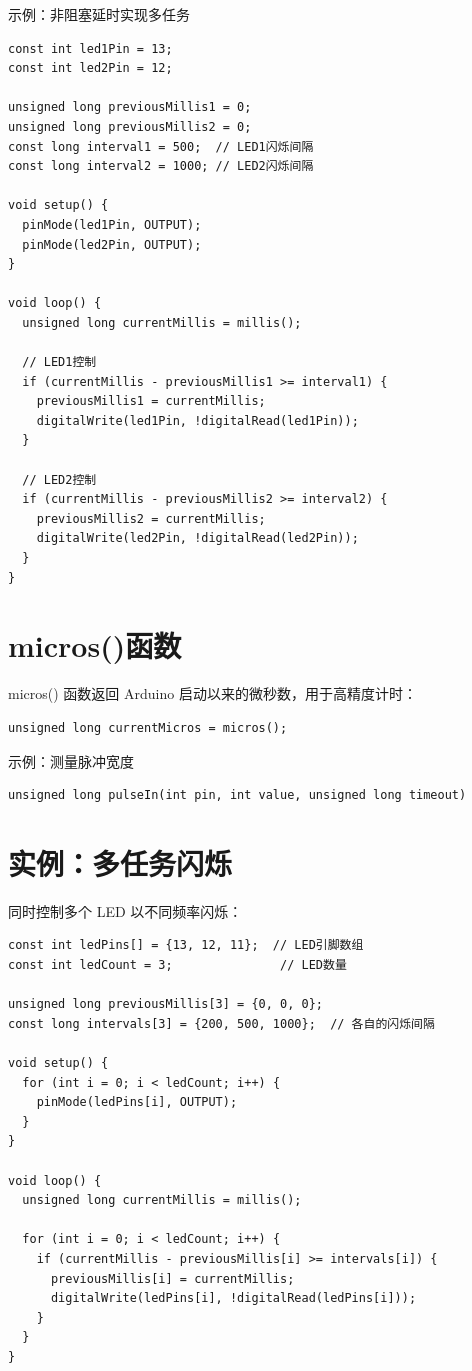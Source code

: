 \documentclass[12pt,UTF8]{ctexbook}
\begin{document}
示例：非阻塞延时实现多任务
\begin{lstlisting}
const int led1Pin = 13;
const int led2Pin = 12;

unsigned long previousMillis1 = 0;
unsigned long previousMillis2 = 0;
const long interval1 = 500;  // LED1闪烁间隔
const long interval2 = 1000; // LED2闪烁间隔

void setup() {
  pinMode(led1Pin, OUTPUT);
  pinMode(led2Pin, OUTPUT);
}

void loop() {
  unsigned long currentMillis = millis();
  
  // LED1控制
  if (currentMillis - previousMillis1 >= interval1) {
    previousMillis1 = currentMillis;
    digitalWrite(led1Pin, !digitalRead(led1Pin));
  }
  
  // LED2控制
  if (currentMillis - previousMillis2 >= interval2) {
    previousMillis2 = currentMillis;
    digitalWrite(led2Pin, !digitalRead(led2Pin));
  }
}
\end{lstlisting}

\section{micros()函数}

micros() 函数返回 Arduino 启动以来的微秒数，用于高精度计时：

\begin{lstlisting}
unsigned long currentMicros = micros();
\end{lstlisting}

示例：测量脉冲宽度
\begin{lstlisting}
unsigned long pulseIn(int pin, int value, unsigned long timeout)
\end{lstlisting}

\section{实例：多任务闪烁}

同时控制多个 LED 以不同频率闪烁：

\begin{lstlisting}
const int ledPins[] = {13, 12, 11};  // LED引脚数组
const int ledCount = 3;               // LED数量

unsigned long previousMillis[3] = {0, 0, 0};
const long intervals[3] = {200, 500, 1000};  // 各自的闪烁间隔

void setup() {
  for (int i = 0; i < ledCount; i++) {
    pinMode(ledPins[i], OUTPUT);
  }
}

void loop() {
  unsigned long currentMillis = millis();
  
  for (int i = 0; i < ledCount; i++) {
    if (currentMillis - previousMillis[i] >= intervals[i]) {
      previousMillis[i] = currentMillis;
      digitalWrite(ledPins[i], !digitalRead(ledPins[i]));
    }
  }
}
\end{lstlisting}
\end{document}
